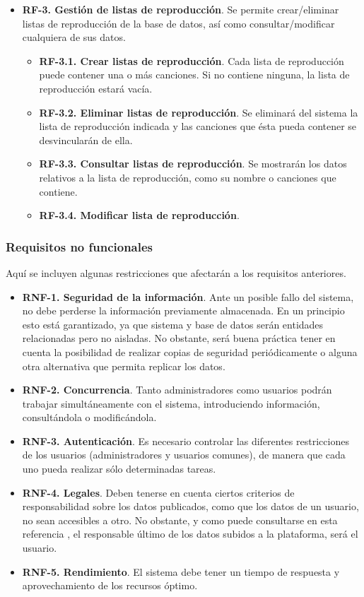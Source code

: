 \begin{itemize}
	\item \textbf{RF-3. Gestión de listas de reproducción}. Se permite crear/eliminar listas de reproducción de la base de datos, así como consultar/modificar cualquiera de sus datos.
	\begin{itemize}
		\item \textbf{RF-3.1. Crear listas de reproducción}. Cada lista de reproducción puede contener una o más canciones. Si no contiene ninguna, la lista de reproducción estará vacía.
		\item \textbf{RF-3.2. Eliminar listas de reproducción}. Se eliminará del sistema la lista de reproducción indicada y las canciones que ésta pueda contener se desvincularán de ella.
		\item \textbf{RF-3.3. Consultar listas de reproducción}. Se mostrarán los datos relativos a la lista de reproducción, como su nombre o canciones que contiene.
		\item \textbf{RF-3.4. Modificar lista de reproducción}. 
	\end{itemize}	 
\end{itemize}
\subsubsection{Requisitos no funcionales}
Aquí se incluyen algunas restricciones que afectarán a los requisitos anteriores.

\begin{itemize}

	\item \textbf{RNF-1. Seguridad de la información}. Ante un posible fallo del sistema, no debe perderse la información previamente almacenada. En un principio esto está garantizado, ya que sistema y base de datos serán entidades relacionadas pero no aisladas. No obstante, será buena práctica tener en cuenta la posibilidad de realizar copias de seguridad periódicamente o alguna otra alternativa que permita replicar los datos.

	\item \textbf{RNF-2. Concurrencia}. Tanto administradores como usuarios podrán trabajar simultáneamente con el sistema,
introduciendo información, consultándola o modificándola.

	\item \textbf{RNF-3. Autenticación}. Es necesario controlar las diferentes restricciones de los usuarios (administradores y usuarios comunes), de manera que cada uno pueda realizar sólo determinadas tareas.

	\item \textbf{RNF-4. Legales}. Deben tenerse en cuenta ciertos criterios de responsabilidad sobre los datos publicados, como que los datos de un usuario, no sean accesibles a otro. No obstante, y como puede consultarse en esta referencia \cite{GMELNEL}, el responsable último de los datos subidos a la plataforma, será el usuario.
	
	\item \textbf{RNF-5. Rendimiento}. El sistema debe tener un tiempo de respuesta y aprovechamiento de los recursos
óptimo.

\end{itemize}

